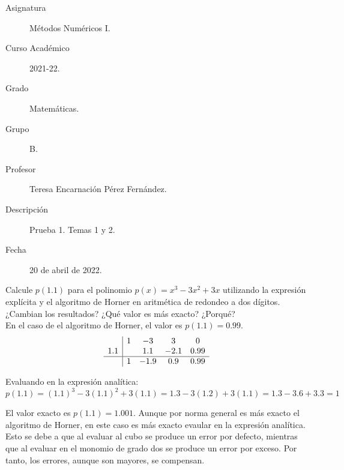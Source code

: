 \documentclass[12pt]{article}
\begin{document}

    
    

    \begin{description}
        \item[Asignatura] Métodos Numéricos I.
        \item[Curso Académico] 2021-22.
        \item[Grado] Matemáticas.
        \item[Grupo] B.
        \item[Profesor] Teresa Encarnación Pérez Fernández.
        \item[Descripción] Prueba 1. Temas 1 y 2.
        \item[Fecha] 20 de abril de 2022.
    
    \end{description}
    \newpage
    
    \begin{ejercicio} 
    Calcule $p(1.1)$ para el polinomio $p(x) = x^3 -3 x^2 + 3 x$ utilizando la expresión explícita y el algoritmo de Horner en aritmética de redondeo a dos dígitos. ¿Cambian los resultados? ¿Qué valor es más exacto? ¿Porqué?\\

    En el caso de el algoritmo de Horner, el valor es $p(1.1)=0.99$.
    \begin{equation*}
        \begin{array}{c|cccc}
             & 1 & -3 & 3 & 0 \\
            1.1  & & 1.1 & -2.1 & 0.99\\ \hline
            & 1 & -1.9 & 0.9 & 0.99
        \end{array}
    \end{equation*}

    Evaluando en la expresión analítica:
    \begin{equation*}
        p(1.1)=(1.1)^3 -3 (1.1)^2 + 3 (1.1) = 1.3 -3(1.2) + 3(1.1) = 1.3 -3.6 + 3.3 = 1
    \end{equation*}

    El valor exacto es $p(1.1)=1.001$. Aunque por norma general es más exacto el algoritmo de Horner, en este caso es más exacto evaular en la expresión analítica. Esto se debe a que al evaluar al cubo se produce un error por defecto, mientras que al evaluar en el monomio de grado dos se produce un error por exceso. Por tanto, los errores, aunque son mayores, se compensan.
\end{ejercicio}
\end{document}
